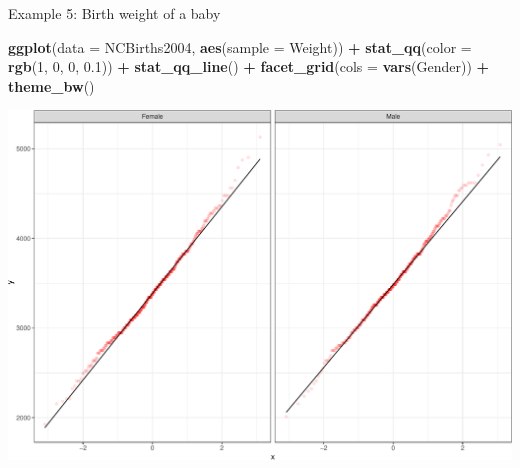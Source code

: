 \documentclass[
  ignorenonframetext,
]{beamer}
\newenvironment{Shaded}{\begin{snugshade}}{\end{snugshade}}
\newcommand{\AttributeTok}[1]{\textcolor[rgb]{0.13,0.29,0.53}{#1}}
\newcommand{\DecValTok}[1]{\textcolor[rgb]{0.00,0.00,0.81}{#1}}
\newcommand{\FloatTok}[1]{\textcolor[rgb]{0.00,0.00,0.81}{#1}}
\newcommand{\FunctionTok}[1]{\textcolor[rgb]{0.13,0.29,0.53}{\textbf{#1}}}
\newcommand{\NormalTok}[1]{#1}
\newcommand{\SpecialCharTok}[1]{\textcolor[rgb]{0.81,0.36,0.00}{\textbf{#1}}}
\begin{document}
\begin{frame}[fragile]{Example 5: Birth weight of a baby}
\protect\hypertarget{example-5-birth-weight-of-a-baby-3}{}
\tiny

\begin{Shaded}
\begin{Highlighting}[]
\FunctionTok{ggplot}\NormalTok{(}\AttributeTok{data =}\NormalTok{ NCBirths2004, }\FunctionTok{aes}\NormalTok{(}\AttributeTok{sample =}\NormalTok{ Weight)) }\SpecialCharTok{+} 
  \FunctionTok{stat\_qq}\NormalTok{(}\AttributeTok{color =} \FunctionTok{rgb}\NormalTok{(}\DecValTok{1}\NormalTok{, }\DecValTok{0}\NormalTok{, }\DecValTok{0}\NormalTok{, }\FloatTok{0.1}\NormalTok{)) }\SpecialCharTok{+} 
  \FunctionTok{stat\_qq\_line}\NormalTok{() }\SpecialCharTok{+}
  \FunctionTok{facet\_grid}\NormalTok{(}\AttributeTok{cols =} \FunctionTok{vars}\NormalTok{(Gender)) }\SpecialCharTok{+} 
  \FunctionTok{theme\_bw}\NormalTok{()}
\end{Highlighting}
\end{Shaded}

\begin{center}\includegraphics[width=0.7\linewidth,height=0.5\textheight]{Week10_Lect_files/figure-beamer/unnamed-chunk-62-1} \end{center}
\normalsize
\end{frame}
\end{document}
